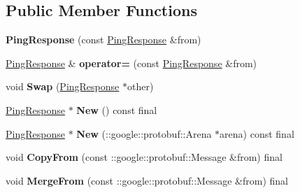 \subsection*{Public Member Functions}
\begin{DoxyCompactItemize}
\item 
\mbox{\label{classcoappbrpc_1_1api_1_1PingResponse_a793e16501d0d8d2a9f741484f479e76d}} 
{\bfseries Ping\+Response} (const \hyperlink{classcoappbrpc_1_1api_1_1PingResponse}{Ping\+Response} \&from)
\item 
\mbox{\label{classcoappbrpc_1_1api_1_1PingResponse_a3a53bb2a841912d369c4056040889a45}} 
\hyperlink{classcoappbrpc_1_1api_1_1PingResponse}{Ping\+Response} \& {\bfseries operator=} (const \hyperlink{classcoappbrpc_1_1api_1_1PingResponse}{Ping\+Response} \&from)
\item 
\mbox{\label{classcoappbrpc_1_1api_1_1PingResponse_ad3bd4d3d1deee9c57ac19f02e0d0cd6a}} 
void {\bfseries Swap} (\hyperlink{classcoappbrpc_1_1api_1_1PingResponse}{Ping\+Response} $\ast$other)
\item 
\mbox{\label{classcoappbrpc_1_1api_1_1PingResponse_a4b459e06a9ac88ea06affaddf7d0be92}} 
\hyperlink{classcoappbrpc_1_1api_1_1PingResponse}{Ping\+Response} $\ast$ {\bfseries New} () const final
\item 
\mbox{\label{classcoappbrpc_1_1api_1_1PingResponse_ac0e13d5f4b8664e915a88f098844ebb7}} 
\hyperlink{classcoappbrpc_1_1api_1_1PingResponse}{Ping\+Response} $\ast$ {\bfseries New} (\+::google\+::protobuf\+::\+Arena $\ast$arena) const final
\item 
\mbox{\label{classcoappbrpc_1_1api_1_1PingResponse_ad54acab5f5d24495c86e9048d766a9f5}} 
void {\bfseries Copy\+From} (const \+::google\+::protobuf\+::\+Message \&from) final
\item 
\mbox{\label{classcoappbrpc_1_1api_1_1PingResponse_a6666cdae2fedae306d7c645010f9ae8b}} 
void {\bfseries Merge\+From} (const \+::google\+::protobuf\+::\+Message \&from) final

\end{DoxyCompactItemize}
